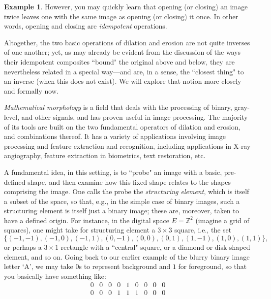 \documentclass[a4paper]{book}
\theoremstyle{definition}
\newtheorem{example}{Example}[section]
\theoremstyle{definition}
\theoremstyle{definition}
\theoremstyle{theorem}
\theoremstyle{definition}
\begin{document}
\begin{example}
	However, you may quickly learn that opening (or closing) an image twice leaves one with the same image as opening (or closing) it once. In other words, opening and closing are \textit{idempotent} operations. \par 
	Altogether, the two basic operations of dilation and erosion are not quite inverses of one another; yet, as may already be evident from the discussion of the ways their idempotent composites ``bound" the original above and below, they are nevertheless related in a special way---and are, in a sense, the ``closest thing" to an inverse (when this does not exist). We will explore that notion more closely and formally now.\par 
	\textit{Mathematical morphology}  is a field that deals with the processing of binary, gray-level, and other signals, and has proven useful in image processing. The majority of its tools are built on the two fundamental operators of dilation and erosion, and combinations thereof. It has a variety of applications involving image processing and feature extraction and recognition, including applications in X-ray angiography, feature extraction in biometrics, text restoration, etc.\par 
	A fundamental idea, in this setting, is to ``probe" an image with a basic, pre-defined shape, and then examine how this fixed shape relates to the shapes comprising the image. One calls the probe the \textit{structuring element}, which is itself a subset of the space, so that, e.g., in the simple case of binary images, such a structuring element is itself just a binary image; these are, moreover, taken to have a defined origin. For instance, in the digital space $E = \mathbb{Z}^2$ (imagine a grid of squares), one might take for structuring element a $3 \times 3$ square, i.e., the set 
	\begin{equation*} 
	\{(-1,-1), (-1,0), (-1,1), (0,-1), (0,0), (0,1), (1,-1), (1,0), (1,1) \},
	\end{equation*} or perhaps a $3 \times 1$ rectangle with a ``central" square, or a diamond or disk-shaped element, and so on. Going back to our earlier example of the blurry binary image letter `A', we may take $0$s to represent background and $1$ for foreground, so that you basically have something like: 
	\begin{equation*} 
	\begin{smallmatrix}
	0 & 0 & 0 & 0 & 1 & 0 & 0 & 0 & 0\\
	0 & 0 & 0 & 1 & 1 & 1 & 0 & 0 & 0\\ 

\end{smallmatrix}
\end{equation*}
\end{example}
\end{document}
